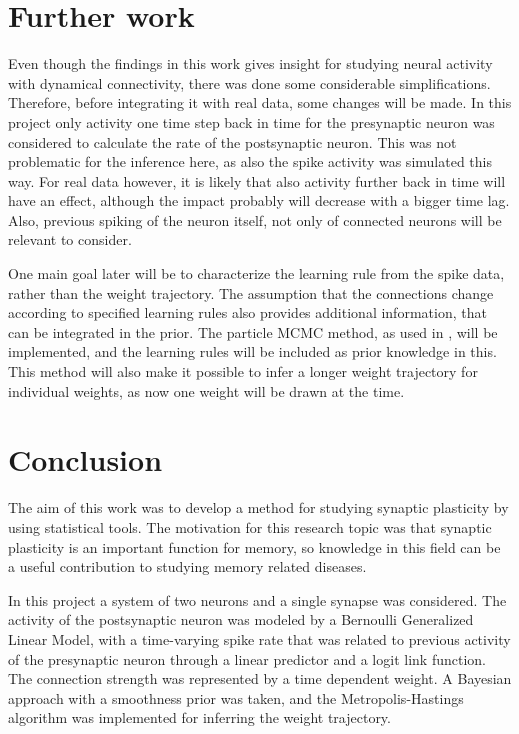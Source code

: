 \section{Further work}
\label{sec:FW}

Even though the findings in this work gives insight for studying neural activity with dynamical connectivity, there was done some considerable simplifications. Therefore, before integrating it with real data, some changes will be made. In this project only activity one time step back in time for the presynaptic neuron was considered to calculate the rate of the postsynaptic neuron. This was not problematic for the inference here, as also the spike activity was simulated this way. For real data however, it is likely that also activity further back in time will have an effect, although the impact probably will decrease with a bigger time lag. Also, previous spiking of the neuron itself, not only of connected neurons will be relevant to consider. 

One main goal later will be to characterize the learning rule from the spike data, rather than the weight trajectory. The assumption that the connections change according to specified learning rules also provides additional information, that can be integrated in the prior. The particle MCMC method, as used in \cite{Linderman}, will be implemented, and the learning rules will be included as prior knowledge in this. This method will also make it possible to infer a longer weight trajectory for individual weights, as now one weight will be drawn at the time. 


\section{Conclusion}
\label{sec:conclusion}

The aim of this work was to develop a method for studying synaptic plasticity by using statistical tools. The motivation for this research topic was that synaptic plasticity is an important function for memory, so knowledge in this field can be a useful contribution to studying memory related diseases. 

In this project a system of two neurons and a single synapse was considered. The activity of the postsynaptic neuron was modeled by a Bernoulli Generalized Linear Model, with a time-varying spike rate that was related to previous activity of the presynaptic neuron through a linear predictor and a logit link function. The connection strength was represented by a time dependent weight. A Bayesian approach with a smoothness prior was taken, and the Metropolis-Hastings algorithm was implemented for inferring the weight trajectory. 

